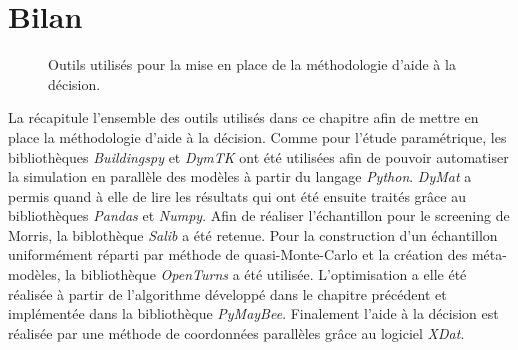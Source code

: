 

\section{Bilan} %
\label{sec:bilan}
\begin{figure}
    \centering
    \caption[Outils utilisés pour la mise en place de la méthodologie d’aide à la décision]
            {Outils utilisés pour la mise en place de la méthodologie d’aide à la décision.}
    \label{fig:outils_methode}
\end{figure}

La  récapitule l’ensemble des outils utilisés dans ce chapitre
afin de mettre en place la méthodologie d’aide à la décision. Comme pour l’étude
paramétrique, les bibliothèques \textit{Buildingspy} et \textit{DymTK} ont été utilisées
afin de pouvoir automatiser la simulation en parallèle des modèles à partir du langage
\textit{Python}. \textit{DyMat} a permis quand à elle de lire les résultats qui ont été
ensuite traités grâce au bibliothèques \textit{Pandas} et \textit{Numpy}. Afin de réaliser
l’échantillon pour le screening de Morris, la biblothèque \textit{Salib} a été retenue.
Pour la construction d’un échantillon uniformément réparti par méthode de quasi-Monte-Carlo
et la création des méta-modèles, la bibliothèque \textit{OpenTurns} a été utilisée.
L’optimisation a elle été réalisée à partir de l’algorithme développé dans le chapitre
précédent et implémentée dans la bibliothèque \textit{PyMayBee}. Finalement l’aide à la
décision est réalisée par une méthode de coordonnées parallèles grâce au logiciel
\textit{XDat}.
